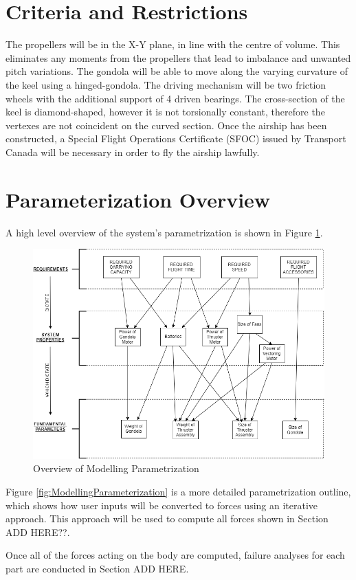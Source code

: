 \documentclass[../main.tex]{subfiles}
\begin{document}
\section{Criteria and Restrictions}
The propellers will be in the X-Y plane, in line with the centre of volume. This eliminates any moments from the propellers that lead to imbalance and unwanted pitch variations. The gondola will be able to move along the varying curvature of the keel using a hinged-gondola. The driving mechanism will be two friction wheels with the additional support of 4 driven bearings. The cross-section of the keel is diamond-shaped, however it is not torsionally constant, therefore the vertexes are not coincident on the curved section. Once the airship has been constructed, a Special Flight Operations Certificate (SFOC) issued by Transport Canada will be necessary in order to fly the airship lawfully.

\section{Parameterization Overview}
A high level overview of the system's parametrization is shown in Figure \ref{fig:ModellingOutline}.

\begin{figure}[H]
	\centering
	\includegraphics[width=\textwidth]{img/paramaterization/Brief_Overview.png}
	\caption{Overview of Modelling Parametrization}
	\label{fig:ModellingOutline}
\end{figure}

Figure \ref{fig:ModellingParameterization} is a more detailed parametrization outline, which shows how user inputs will be converted to forces using an iterative approach. This approach will be used to compute all forces shown in Section ADD HERE??.


Once all of the forces acting on the body are computed, failure analyses for each part are conducted in Section ADD HERE.
\end{document}
